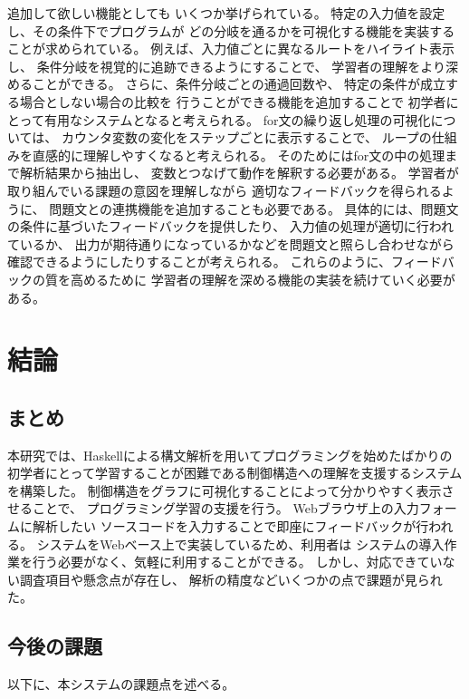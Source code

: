 \documentclass{cssspaper}
\begin{document}
        追加して欲しい機能としても
        いくつか挙げられている。
        特定の入力値を設定し、その条件下でプログラムが
        どの分岐を通るかを可視化する機能を実装することが求められている。
        例えば、入力値ごとに異なるルートをハイライト表示し、
        条件分岐を視覚的に追跡できるようにすることで、
        学習者の理解をより深めることができる。
        さらに、条件分岐ごとの通過回数や、
        特定の条件が成立する場合としない場合の比較を
        行うことができる機能を追加することで
        初学者にとって有用なシステムとなると考えられる。
        for文の繰り返し処理の可視化については、
        カウンタ変数の変化をステップごとに表示することで、
        ループの仕組みを直感的に理解しやすくなると考えられる。
        そのためにはfor文の中の処理まで解析結果から抽出し、
        変数とつなげて動作を解釈する必要がある。
        学習者が取り組んでいる課題の意図を理解しながら
        適切なフィードバックを得られるように、
        問題文との連携機能を追加することも必要である。
        具体的には、問題文の条件に基づいたフィードバックを提供したり、
        入力値の処理が適切に行われているか、
        出力が期待通りになっているかなどを問題文と照らし合わせながら
        確認できるようにしたりすることが考えられる。
        これらのように、フィードバックの質を高めるために
        学習者の理解を深める機能の実装を続けていく必要がある。

    \chapter{結論}
        \section{まとめ}
        本研究では、Haskellによる構文解析を用いてプログラミングを始めたばかりの
        初学者にとって学習することが困難である制御構造への理解を支援するシステムを構築した。
        制御構造をグラフに可視化することによって分かりやすく表示させることで、
        プログラミング学習の支援を行う。
        Webブラウザ上の入力フォームに解析したい
        ソースコードを入力することで即座にフィードバックが行われる。
        システムをWebベース上で実装しているため、利用者は
        システムの導入作業を行う必要がなく、気軽に利用することができる。
        しかし、対応できていない調査項目や懸念点が存在し、
        解析の精度などいくつかの点で課題が見られた。

        \section{今後の課題}
        以下に、本システムの課題点を述べる。
\end{document}
